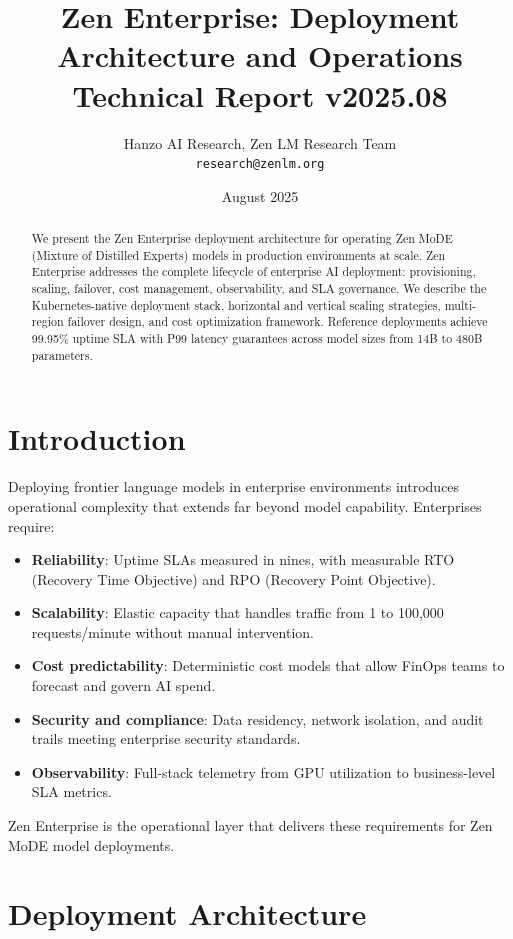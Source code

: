 \documentclass[11pt,a4paper]{article}
\title{\textbf{Zen Enterprise: Deployment Architecture and Operations}\\
\large Technical Report v2025.08}
\author{Hanzo AI Research, Zen LM Research Team\\
\texttt{research@zenlm.org}}
\date{August 2025}
\begin{document}
\maketitle

\begin{abstract}
We present the Zen Enterprise deployment architecture for operating Zen MoDE (Mixture of Distilled Experts) models in production environments at scale. Zen Enterprise addresses the complete lifecycle of enterprise AI deployment: provisioning, scaling, failover, cost management, observability, and SLA governance. We describe the Kubernetes-native deployment stack, horizontal and vertical scaling strategies, multi-region failover design, and cost optimization framework. Reference deployments achieve 99.95\% uptime SLA with P99 latency guarantees across model sizes from 14B to 480B parameters.
\end{abstract}

\section{Introduction}

Deploying frontier language models in enterprise environments introduces operational complexity that extends far beyond model capability. Enterprises require:

\begin{itemize}
  \item \textbf{Reliability}: Uptime SLAs measured in nines, with measurable RTO (Recovery Time Objective) and RPO (Recovery Point Objective).
  \item \textbf{Scalability}: Elastic capacity that handles traffic from 1 to 100,000 requests/minute without manual intervention.
  \item \textbf{Cost predictability}: Deterministic cost models that allow FinOps teams to forecast and govern AI spend.
  \item \textbf{Security and compliance}: Data residency, network isolation, and audit trails meeting enterprise security standards.
  \item \textbf{Observability}: Full-stack telemetry from GPU utilization to business-level SLA metrics.
\end{itemize}

Zen Enterprise is the operational layer that delivers these requirements for Zen MoDE model deployments.

\section{Deployment Architecture}
\end{document}
